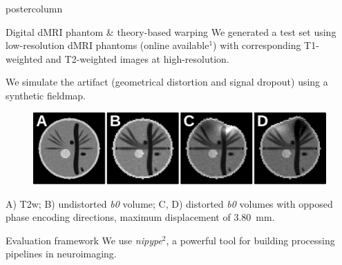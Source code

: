 \documentclass[final,hyperref={pdfpagelabels=false}]{beamer}
\newlength{\columnheight}
\begin{document}
\begin{frame}[t]
{\begin{minipage}[t][\columnheight][c]{0.95\textwidth}
{\begin{columns}[t,totalwidth=\textwidth]
    \begin{column}{.64\linewidth}
      \begin{beamercolorbox}[center,wd=\textwidth]{postercolumn}
        \begin{minipage}[T]{.95\textwidth} %
          \parbox[t]{\textwidth}{ %
	        \begin{block}{Digital dMRI phantom \& theory-based warping}
          We generated a test set using low-resolution dMRI phantoms (online available$^{1}$)
          with corresponding T1-weighted and T2-weighted images at high-resolution.

          We simulate the artifact (geometrical distortion and signal dropout) using a synthetic fieldmap.
              \begin{figure}[thpb]
                 \centering
                 \includegraphics[width=0.95\columnwidth]{Fig01-Phantom}
              \end{figure}
              A) T2w; B) undistorted \textit{b0} volume;
                 C, D) distorted \textit{b0} volumes with opposed phase 
                 encoding directions, maximum displacement of 3.80~mm.
          \end{block}

          \begin{block}{Evaluation framework}
          We use \emph{nipype}$^{2}$, a powerful tool for building processing pipelines in
          neuroimaging.


\end{block}}
\end{minipage}
\end{beamercolorbox}
\end{column}
\end{columns}}
\end{minipage}}
\end{frame}
\end{document}
